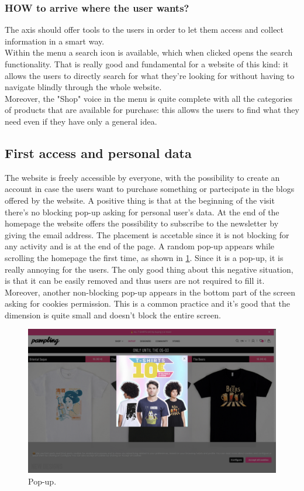\subsubsection{HOW to arrive where the user wants?} 
The axis should offer tools to the users in order to let them access and collect information in a smart way.\\

Within the menu a search icon is available, which when clicked opens the search functionality. That is really good and fundamental for a website of this kind: it allows the users 
to directly search for what they're looking for without having to navigate blindly through the whole website.\\
Moreover, the "Shop" voice in the menu is quite complete with all the categories of products that are available for purchase: this allows the users to find what they need even if they have
only a general idea.


\subsection{First access and personal data}
The website is freely accessible by everyone, with the possibility to create an account in case the users want to purchase something 
or partecipate in the blogs offered by the website. 
A positive thing is that at the beginning of the visit there's no blocking pop-up asking for personal user's data. 
At the end of the homepage the website offers the possibility to subscribe to the newsletter by giving the email address.
The placement is accetable since it is not blocking for any activity and is at the end of the page.
A random pop-up appears while scrolling the homepage the first time, as shown in \cref{fig:pop-up}. Since it is a pop-up, it is really annoying for the users. 
The only good thing about this negative situation, is that it can be easily removed and thus users are not required to fill it.
Moreover, another non-blocking pop-up appears in the bottom part of the screen asking for cookies permission. This is
a common practice and it's good that the dimension is quite small and doesn't block the entire screen.

\begin{figure}[h!]
	\centering
	\includegraphics[scale=0.225]{images/first-visit.png}
	\caption{Pop-up.}
	\label{fig:pop-up}
\end{figure}

